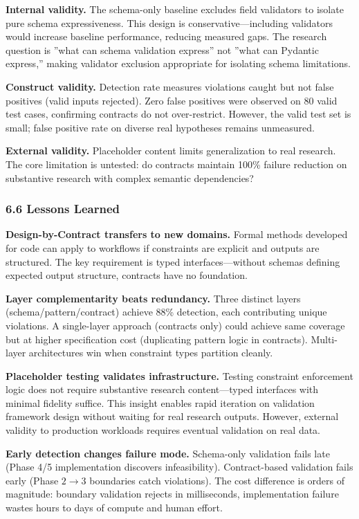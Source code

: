 \textbf{Internal validity.} The schema-only baseline excludes field validators to isolate pure schema expressiveness. This design is conservative---including validators would increase baseline performance, reducing measured gaps. The research question is ''what can schema validation express'' not ''what can Pydantic express,'' making validator exclusion appropriate for isolating schema limitations.

\textbf{Construct validity.} Detection rate measures violations caught but not false positives (valid inputs rejected). Zero false positives were observed on 80 valid test cases, confirming contracts do not over-restrict. However, the valid test set is small; false positive rate on diverse real hypotheses remains unmeasured.

\textbf{External validity.} Placeholder content limits generalization to real research. The core limitation is untested: do contracts maintain 100\% failure reduction on substantive research with complex semantic dependencies?

\subsubsection{6.6 Lessons Learned}

\textbf{Design-by-Contract transfers to new domains.} Formal methods developed for code can apply to workflows if constraints are explicit and outputs are structured. The key requirement is typed interfaces---without schemas defining expected output structure, contracts have no foundation.

\textbf{Layer complementarity beats redundancy.} Three distinct layers (schema/pattern/contract) achieve 88\% detection, each contributing unique violations. A single-layer approach (contracts only) could achieve same coverage but at higher specification cost (duplicating pattern logic in contracts). Multi-layer architectures win when constraint types partition cleanly.

\textbf{Placeholder testing validates infrastructure.} Testing constraint enforcement logic does not require substantive research content---typed interfaces with minimal fidelity suffice. This insight enables rapid iteration on validation framework design without waiting for real research outputs. However, external validity to production workloads requires eventual validation on real data.

\textbf{Early detection changes failure mode.} Schema-only validation fails late (Phase 4/5 implementation discovers infeasibility). Contract-based validation fails early (Phase $2\rightarrow 3$ boundaries catch violations). The cost difference is orders of magnitude: boundary validation rejects in milliseconds, implementation failure wastes hours to days of compute and human effort.
